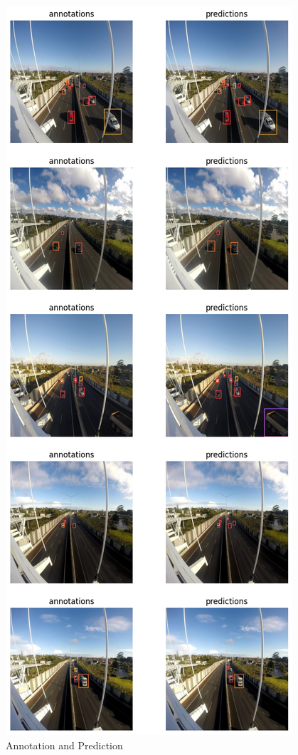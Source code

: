\begin{figure}[H]
    \centering
    \includegraphics[width=0.6\linewidth]{tex/img/S-annotation_&_prediction.png}
    \caption{Annotation and Prediction}
    \label{fig:L-annot-pred}
\end{figure}

